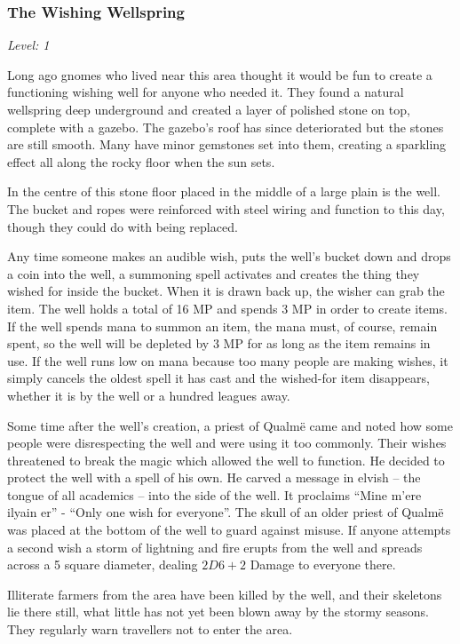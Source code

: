 \begin{multicols}{2}
\subsubsection{The Wishing Wellspring}

\textit{Level: 1}

Long ago gnomes who lived near this area thought it would be fun to create a functioning wishing well for anyone who needed it.  They found a natural wellspring deep underground and created a layer of polished stone on top, complete with a gazebo.  The gazebo's roof has since deteriorated but the stones are still smooth.  Many have minor gemstones set into them, creating a sparkling effect all along the rocky floor when the sun sets.

In the centre of this stone floor placed in the middle of a large plain is the well.  The bucket and ropes were reinforced with steel wiring and function to this day, though they could do with being replaced.

Any time someone makes an audible wish, puts the well's bucket down and drops a coin into the well, a summoning spell activates and creates the thing they wished for inside the bucket.  When it is drawn back up, the wisher can grab the item.  The well holds a total of 16 MP and spends 3 MP in order to create items.  If the well spends mana to summon an item, the mana must, of course, remain spent, so the well will be depleted by 3 MP for as long as the item remains in use.  If the well runs low on mana because too many people are making wishes, it simply cancels the oldest spell it has cast and the wished-for item disappears, whether it is by the well or a hundred leagues away.

Some time after the well's creation, a priest of Qualm\"{e} came and noted how some people were disrespecting the well and were using it too commonly.  Their wishes threatened to break the magic which allowed the well to function.  He decided to protect the well with a spell of his own.  He carved a message in elvish -- the tongue of all academics -- into the side of the well.  It proclaims ``Mine m'{e}re ilyain er'' - ``Only one wish for everyone''.  The skull of an older priest of Qualm\"{e} was placed at the bottom of the well to guard against misuse.  If anyone attempts a second wish a storm of lightning and fire erupts from the well and spreads across a 5 square diameter, dealing $2D6+2$ Damage to everyone there.

Illiterate farmers from the area have been killed by the well, and their skeletons lie there still, what little has not yet been blown away by the stormy seasons.  They regularly warn travellers not to enter the area.


\end{multicols}
